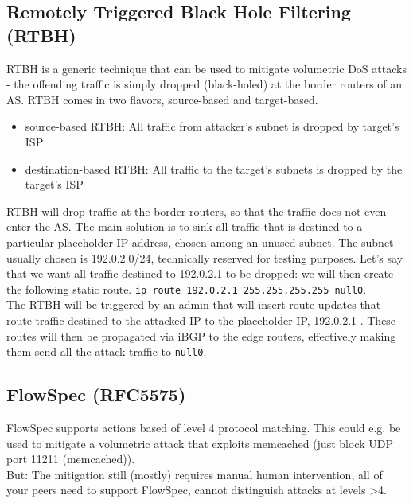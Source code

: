 \documentclass[11pt,oneside,a4paper]{article}
\begin{document}
\subsection{Remotely Triggered Black Hole Filtering (RTBH)}

RTBH is a generic technique that can be used to mitigate volumetric DoS attacks - the offending traffic is simply dropped (black-holed) at the border routers of an AS. RTBH comes in two flavors, source-based and target-based.

\begin{itemize}
	\setlength{\itemsep}{0pt}
	\setlength{\parskip}{0pt}
	\item source-based RTBH: All traffic from attacker's subnet is dropped by target's ISP
	\item destination-based RTBH: All traffic to the target’s subnets is dropped by the target’s ISP\\
\end{itemize}
\vspace{-\topsep}

\noindent RTBH will drop traffic at the border routers, so that the traffic does not even enter the AS. The main solution is to sink all traffic that is destined to a particular placeholder IP address, chosen among an unused subnet. The subnet usually chosen is 192.0.2.0/24, technically reserved for testing purposes. Let’s say that we want all traffic destined to 192.0.2.1 to be dropped: we will then create the following static route. \texttt{ip route 192.0.2.1 255.255.255.255 null0}.\\
The RTBH will be triggered by an admin that will insert route updates that route traffic destined to the
attacked IP to the placeholder IP, 192.0.2.1 . These routes will then be propagated via iBGP to the edge routers, effectively making them send all the attack traffic to \texttt{null0}.

\subsection{FlowSpec (RFC5575)}

FlowSpec supports actions based of level 4 protocol matching. This could e.g. be used to mitigate a volumetric attack that exploits memcached (just block UDP port 11211 (memcached)).\\
But: The mitigation still (mostly) requires manual human intervention, all of your peers need to support FlowSpec, cannot distinguish attacks at levels \textgreater 4.
\end{document}
